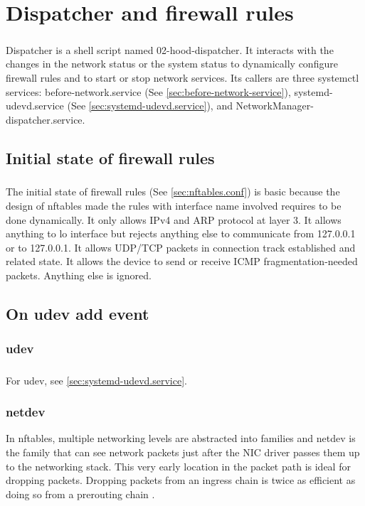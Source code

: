 \documentclass[mscthesis]{usiinfthesis}
\begin{document}
\chapter{Dispatcher and firewall rules}\label{cha:dispatcher}
\paragraph{}
Dispatcher is a shell script named 02-hood-dispatcher. It interacts with the changes in the network status or the system status to dynamically configure firewall rules and to start or stop network services. Its callers are three systemctl services: before-network.service (See \cref{sec:before-network-service}), systemd-udevd.service (See \cref{sec:systemd-udevd.service}), and NetworkManager-dispatcher.service.

\section{Initial state of firewall rules}
\paragraph{}
The initial state of firewall rules (See \cref{sec:nftables.conf}) is basic because the design of nftables made the rules with interface name involved requires to be done dynamically. It only allows IPv4 and ARP protocol at layer 3. It allows anything to lo interface but rejects anything else to communicate from 127.0.0.1 or to 127.0.0.1. It allows UDP/TCP packets in connection track established and related state. It allows the device to send or receive ICMP fragmentation-needed packets. Anything else is ignored.

\section{On udev add event}
\subsection{udev}
\paragraph{}
For udev, see \cref{sec:systemd-udevd.service}.
\subsection{netdev}
In nftables, multiple networking levels are abstracted into families and netdev is the family that can see network packets just after the NIC driver passes them up to the networking stack. This very early location in the packet path is ideal for dropping packets. Dropping packets from an ingress chain is twice as efficient as doing so from a prerouting chain \citep{nftables:netdev}.
\end{document}
